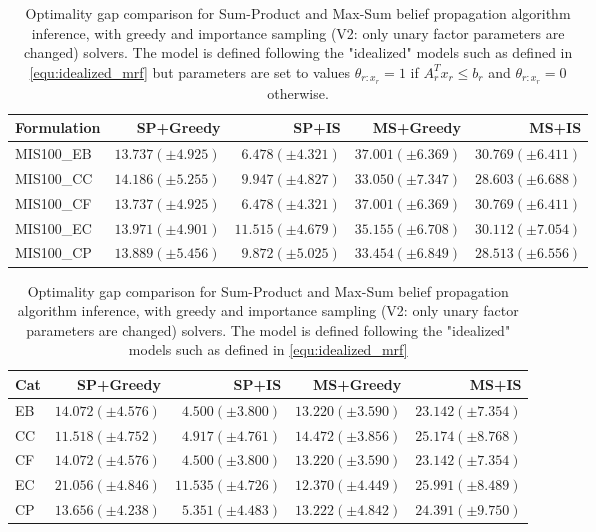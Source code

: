 \begin{table}[!ht]
    \centering
    \begin{tabular}{l|r|r|r|r}
    \hline
        \textbf{Formulation} & \textbf{SP+Greedy} & \textbf{SP+IS} & \textbf{MS+Greedy} & \textbf{MS+IS} \\ \hline
        MIS100\_EB & $13.737 (\pm 4.925)$ & $\mathbf{6.478 (\pm 4.321)}$ & $37.001 (\pm 6.369)$ & $30.769 (\pm 6.411)$ \\
        MIS100\_CC & $14.186 (\pm 5.255)$ & $\mathbf{9.947 (\pm 4.827)}$ & $33.050 (\pm 7.347)$ & $28.603 (\pm 6.688)$ \\
        MIS100\_CF & $13.737 (\pm 4.925)$ & $\mathbf{6.478 (\pm 4.321)}$ & $37.001 (\pm 6.369)$ & $30.769 (\pm 6.411)$ \\
        MIS100\_EC & $13.971 (\pm 4.901)$ & $\mathbf{11.515 (\pm 4.679)}$ & $35.155 (\pm 6.708)$ & $30.112 (\pm 7.054)$ \\
        MIS100\_CP & $13.889 (\pm 5.456)$ & $\mathbf{9.872 (\pm 5.025)}$ & $33.454 (\pm 6.849)$ & $28.513 (\pm 6.556)$ \\ \hline
    \end{tabular}
    \caption{Optimality gap comparison for Sum-Product and Max-Sum belief propagation algorithm inference, with greedy and importance sampling (V2: only unary factor parameters are changed) solvers. The model is defined following the "idealized" models such as defined in \ref{equ:idealized_mrf} but parameters are set to values $\theta_{r:x_r}=1$ if $A_r^T x_r \leq b_r$ and $\theta_{r:x_r}=0$ otherwise.}
    \label{tab:soft_penalty_results}
\end{table}

\begin{table}[!ht]
    \centering
    \begin{tabular}{l||r|r|r|r}
    \hline
        \textbf{Cat} & \textbf{SP+Greedy} & \textbf{SP+IS} & \textbf{MS+Greedy} & \textbf{MS+IS} \\ \hline
        EB & $14.072 (\pm 4.576)$ & $\mathbf{4.500 (\pm 3.800)}$ & $13.220 (\pm 3.590)$ & $23.142 (\pm 7.354)$ \\
        CC & $11.518 (\pm 4.752)$ & $\mathbf{4.917 (\pm 4.761)}$ & $14.472 (\pm 3.856)$ & $25.174 (\pm 8.768)$ \\
        CF & $14.072 (\pm 4.576)$ & $\mathbf{4.500 (\pm 3.800)}$  & $13.220 (\pm 3.590)$ & $23.142 (\pm 7.354)$ \\
        EC & $21.056 (\pm 4.846)$ & $\mathbf{11.535 (\pm 4.726)}$ & $12.370 (\pm 4.449)$ & $25.991 (\pm 8.489)$ \\
        CP & $13.656 (\pm 4.238)$ & $\mathbf{5.351 (\pm 4.483)}$ & $13.222 (\pm 4.842)$ & $24.391 (\pm 9.750)$ \\ \hline
    \end{tabular}
    \caption{Optimality gap comparison for Sum-Product and Max-Sum belief propagation algorithm inference, with greedy and importance sampling (V2: only unary factor parameters are changed) solvers. The model is defined following the "idealized" models such as defined in \ref{equ:idealized_mrf}}
    \label{tab:unary_only_results}
\end{table}

